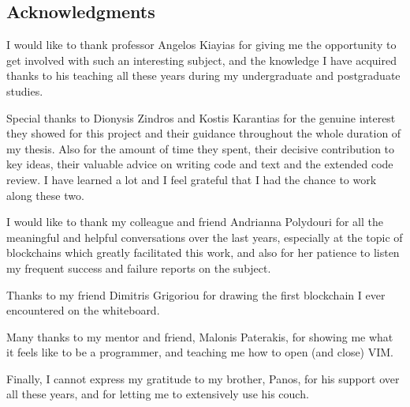 \newpage
\begin{center}
    \section*{Acknowledgments}
\end{center}

I would like to thank professor Angelos Kiayias for giving me the opportunity
to get involved with such an interesting subject, and the knowledge I have
acquired thanks to his teaching all these years during my undergraduate and
postgraduate studies.

Special thanks to Dionysis Zindros and Kostis Karantias for the genuine
interest they showed for this project and their guidance throughout the whole
duration of my thesis. Also for the amount of time they spent, their decisive
contribution to key ideas, their valuable advice on writing code and text and
the extended code review. I have learned a lot and I feel grateful that I had
the chance to work along these two.

I would like to thank my colleague and friend Andrianna Polydouri for all the
meaningful and helpful conversations over the last years, especially at the
topic of blockchains which greatly facilitated this work, and also for her
patience to listen my frequent success and failure reports on the subject.

Thanks to my friend Dimitris Grigoriou for drawing the first blockchain I ever
encountered on the whiteboard.

Many thanks to my mentor and friend, Malonis Paterakis, for showing me
what it feels like to be a programmer, and teaching me how to open (and close)
VIM.

Finally, I cannot express my gratitude to my brother, Panos, for his support
over all these years, and for letting me to extensively use his couch.
